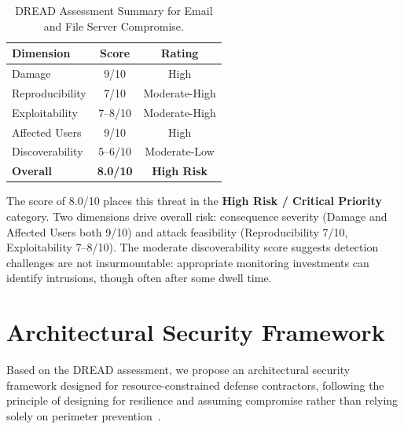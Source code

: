 \documentclass[sigconf,nonacm]{acmart}
\begin{document}
\begin{table}[h]
\caption{DREAD Assessment Summary for Email and File Server Compromise.}
\label{tab:dread-summary}
\small
\begin{tabularx}{\columnwidth}{@{}Xcc@{}}
\toprule
\textbf{Dimension} & \textbf{Score} & \textbf{Rating} \\
\midrule
Damage          & 9/10   & High          \\
Reproducibility & 7/10   & Moderate-High \\
Exploitability  & 7--8/10 & Moderate-High \\
Affected Users  & 9/10   & High          \\
Discoverability & 5--6/10 & Moderate-Low  \\
\midrule
\textbf{Overall} & \textbf{8.0/10} & \textbf{High Risk} \\
\bottomrule
\end{tabularx}
\end{table}

The score of 8.0/10 places this threat in the \textbf{High Risk / Critical Priority}
category. Two dimensions drive overall risk: consequence severity (Damage and Affected
Users both 9/10) and attack feasibility (Reproducibility 7/10, Exploitability 7--8/10).
The moderate discoverability score suggests detection challenges are not
insurmountable: appropriate monitoring investments can identify intrusions, though
often after some dwell time.

\section{Architectural Security Framework}

Based on the DREAD assessment, we propose an architectural security framework designed
for resource-constrained defense contractors, following the principle of designing for
resilience and assuming compromise rather than relying solely on perimeter
prevention~\cite{kelly2023practical}.
\end{document}
